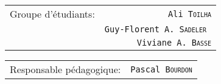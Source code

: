 \begin{titlepage}





\begin{center}
\begin{tabular}{l r}

Groupe d'étudiants: &  \texttt{Ali \textsc{Toilha}}\\
& \texttt{Guy-Florent A. \textsc{Sadeler} }\\ %
&  \texttt{Viviane A. \textsc{Basse}}

\end{tabular}
\end{center}

\vspace*{1cm}
\begin{center}
\begin{tabular}{l r}
Responsable pédagogique: & \texttt{Pascal \textsc{Bourdon}}%
\end{tabular}
\end{center}

\end{titlepage}